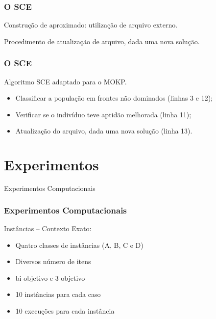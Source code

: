 \documentclass[10pt,xcolor=table,fleqn]{beamer}
\newcommand{\mytitle}[1]{
  \begin{center}
    \color{defblue}
    { \LARGE #1 }
  \end{center}
}
\begin{document}
\begin{frame}
	\frametitle{O SCE}
  Construção de \paretoset{} aproximado: utilização de arquivo externo.
  \vfill
  \begin{algorithm}[H]
    \footnotesize
    
    \caption{Procedimento de atualização de arquivo, dada uma nova solução.}
    \label{alg:archupdate}
  \end{algorithm}
\end{frame}

\begin{frame}
	\frametitle{O SCE}
  \begin{algorithm}[H]
    \scriptsize
    
    \caption{Algoritmo SCE adaptado para o MOKP.}
  \end{algorithm}
  \pause
  \begin{itemize}
    \small
    \item{Classificar a população em frontes não dominados (linhas 3 e 12);}
    \item{Verificar se o indivíduo teve aptidão melhorada (linha 11);}
    \item{Atualização do arquivo, dada uma nova solução (linha 13).}
  \end{itemize}
\end{frame}

\section{Experimentos}

\begin{frame}
	\mytitle{Experimentos Computacionais}
\end{frame}

\begin{frame}
	\frametitle{Experimentos Computacionais}
  \begin{block}{Instâncias -- Contexto Exato:}
    \begin{itemize}
      \setlength\itemsep{0.6em}
      \item{ Quatro classes de instâncias (A, B, C e D) }
      \item{ Diversos número de itens }
      \item{ bi-objetivo e 3-objetivo }
      \item{ 10 instâncias para cada caso }
      \item{ 10 execuções para cada instância }
    \end{itemize}
  \end{block}
\end{frame}
\end{document}
